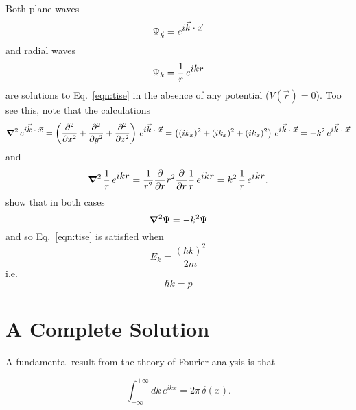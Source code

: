\documentclass[12pt]{article}
\begin{document}
Both plane waves 
\begin{displaymath}
\Psi_{\vec{k}} = e^{\textstyle i\vec{k} \cdot \vec{x}}
\end{displaymath}
and radial waves
\begin{displaymath}
\Psi_k = \frac{1}{r} \, e^{\textstyle ikr}
\end{displaymath}
are solutions to Eq.~\eqref{eqn:tise} in the absence of any potential
($V(\vec{r})=0$).  Too see this, note that the calculations
\begin{displaymath}
\mbox{\boldmath$ \nabla $} ^2 \, e^{\textstyle i\vec{k} \cdot \vec{x}} 
=\left(\frac{\partial^2 }{\partial x^2}  + \frac{\partial^2 }{\partial y^2}  + \frac{\partial^2 }{\partial z^2} \right) \, e^{\textstyle i\vec{k} \cdot \vec{x}}
=\left((ik_x)^2 + (ik_x)^2 + (ik_x)^2\right) \, e^{\textstyle i\vec{k} \cdot \vec{x}}
= -k^2 \, e^{\textstyle i\vec{k} \cdot \vec{x}}
\end{displaymath}
and
\begin{displaymath}
\mbox{\boldmath$ \nabla $} ^2 \, \frac{1}{r} \, e^{\textstyle ikr} = \frac{1}{r^2} \frac{\partial }{\partial r} r^2 \frac{\partial }{\partial r} \frac{1}{r} \, e^{\textstyle ikr}
= k^2 \, \frac{1}{r} \, e^{\textstyle ikr}.
\end{displaymath}
show that in both cases
\begin{equation} \label{eqn:solk}
\mbox{\boldmath$ \nabla $} ^2 \Psi = -k^2 \Psi
\end{equation}
and so Eq.~\eqref{eqn:tise} is satisfied when
\begin{displaymath}
E_k = \frac{(\hbar k)^2}{2m}
\end{displaymath}
i.e.
\begin{displaymath}
\hbar k = p
\end{displaymath}


\section{A Complete Solution}

A fundamental result from the theory of Fourier analysis is that

\begin{equation} \label{eqn:complete}
\int_{-\infty}^{+\infty} dk \, e^{\textstyle ikx} = 2 \pi \, \delta (x).
\end{equation}
\end{document}
